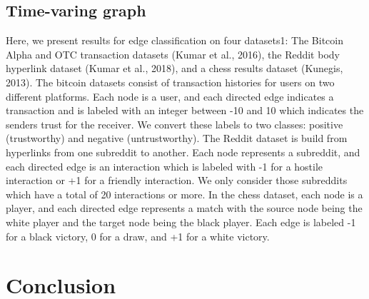 \documentclass[onecolumn, conference]{IEEEtran}
\begin{document}
\subsection{Time-varing graph}
Here, we present results for edge classification on four datasets1: The Bitcoin Alpha and OTC transaction datasets (Kumar et al., 2016), the Reddit body hyperlink dataset (Kumar et al., 2018), 
and a chess results dataset (Kunegis, 2013). 
The bitcoin datasets consist of transaction histories for users on two different platforms. Each node is a user, and each directed edge indicates a transaction and is labeled with an integer between -10 and 10 which indicates the senders trust for the receiver. 
We convert these labels to two classes: positive (trustworthy) and negative (untrustworthy). The Reddit dataset is build from hyperlinks from one subreddit to another. 
Each node represents a subreddit, and each directed edge is an interaction which is labeled with -1 for a hostile interaction or +1 for a friendly interaction. 
We only consider those subreddits which have a total of 20 interactions or more. In the chess dataset, each node is a player, and each directed edge represents a match with the source node being the white player and the target node being the black player. 
Each edge is labeled -1 for a black victory, 0 for a draw, and +1 for a white victory. 
\section{Conclusion}



\end{document}
